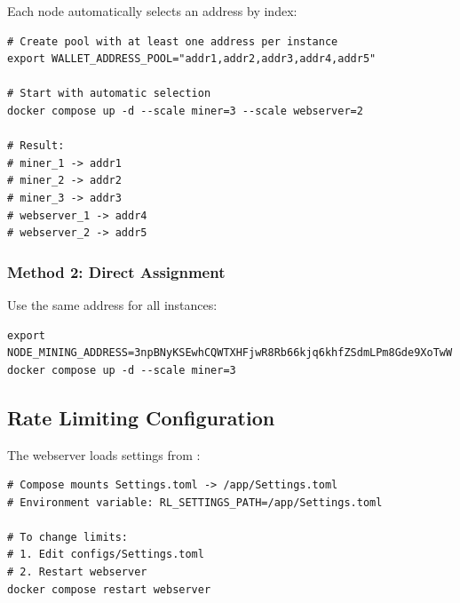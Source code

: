 Each node automatically selects an address by index:

\begin{listing}[htbp]
\caption{Address Pool Configuration}
\label{lst:ch22-address-pool}
\begin{verbatim}
# Create pool with at least one address per instance
export WALLET_ADDRESS_POOL="addr1,addr2,addr3,addr4,addr5"

# Start with automatic selection
docker compose up -d --scale miner=3 --scale webserver=2

# Result:
# miner_1 -> addr1
# miner_2 -> addr2
# miner_3 -> addr3
# webserver_1 -> addr4
# webserver_2 -> addr5
\end{verbatim}
\end{listing}

\subsubsection{Method 2: Direct Assignment}

Use the same address for all instances:

\begin{listing}[htbp]
\caption{Direct Address Assignment}
\label{lst:ch22-direct-address}
\begin{verbatim}
export NODE_MINING_ADDRESS=3npBNyKSEwhCQWTXHFjwR8Rb66kjq6khfZSdmLPm8Gde9XoTwW
docker compose up -d --scale miner=3
\end{verbatim}
\end{listing}

\subsection{Rate Limiting Configuration}

The webserver loads  settings from :

\begin{listing}[htbp]
\caption{Rate Limiting Setup}
\label{lst:ch22-rate-limit}
\begin{verbatim}
# Compose mounts Settings.toml -> /app/Settings.toml
# Environment variable: RL_SETTINGS_PATH=/app/Settings.toml

# To change limits:
# 1. Edit configs/Settings.toml
# 2. Restart webserver
docker compose restart webserver
\end{verbatim}
\end{listing}

